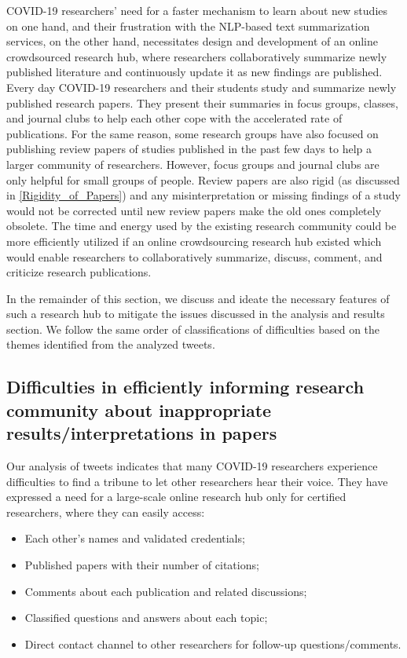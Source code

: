 \documentclass[acmsmall,authordraft]{acmart}
\begin{document}
COVID-19 researchers' need for a faster mechanism to learn about new studies on one hand, and their frustration with the NLP-based text summarization services, on the other hand, necessitates design and development of an online crowdsourced research hub, where researchers collaboratively summarize newly published literature and continuously update it as new findings are published. Every day COVID-19 researchers and their students study and summarize newly published research papers. They present their summaries in focus groups, classes, and journal clubs to help each other cope with the accelerated rate of publications. For the same reason, some research groups have also focused on publishing review papers of studies published in the past few days to help a larger community of researchers. However, focus groups and journal clubs are only helpful for small groups of people. Review papers are also rigid (as discussed in \autoref{Rigidity_of_Papers}) and any misinterpretation or missing findings of a study would not be corrected until new review papers make the old ones completely obsolete. The time and energy used by the existing research community could be more efficiently utilized if an online crowdsourcing research hub existed which would enable researchers to collaboratively summarize, discuss, comment, and criticize research publications.

In the remainder of this section, we discuss and ideate the necessary features of such a research hub to mitigate the issues discussed in the analysis and results section. We follow the same order of classifications of difficulties based on the themes identified from the analyzed tweets.

\subsection{Difficulties in efficiently informing research community about inappropriate results/interpretations in papers}
\label{Discussion_Difficulties_in_efficiently_informing_research_community}
Our analysis of tweets indicates that many COVID-19 researchers experience difficulties to find a tribune to let other researchers hear their voice. They have expressed a need for a large-scale online research hub only for certified researchers, where they can easily access:
\begin{itemize}
   \item Each other’s names and validated credentials;
   \item Published papers with their number of citations;
   \item Comments about each publication and related discussions;
   \item Classified questions and answers about each topic;
   \item Direct contact channel to other researchers for follow-up questions/comments.
\end{itemize}
\end{document}
